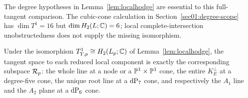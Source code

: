 The degree hypotheses in Lemma~\ref{lem:localhodge} are essential to
this full-tangent comparison.  The cubic-cone calculation in
Section~\ref{sec01:degree-scope} has $\dim T^1=16$ but
$\dim H_2(L;\mathbb{C})=6$; local complete-intersection unobstructedness does
not supply the missing isomorphism.

\begin{lemma}\label{lem:branchhodge}
Under the isomorphism
$T^1_{Y,p}\cong H_2(L_p;\mathbb{C})$ of Lemma~\ref{lem:localhodge}, the tangent space
to each reduced local component is exactly the corresponding
subspace $\mathcal{R}_p$: the whole line at a node or a
$\mathbb{P}^1\times\mathbb{P}^1$ cone, the entire $K_E^\perp$ at a degree-five
cone, the unique root line at a
$\mathrm{dP}_7$ cone, and respectively the $A_1$ line and the $A_2$ plane at a
$\mathrm{dP}_6$ cone.
\end{lemma}

